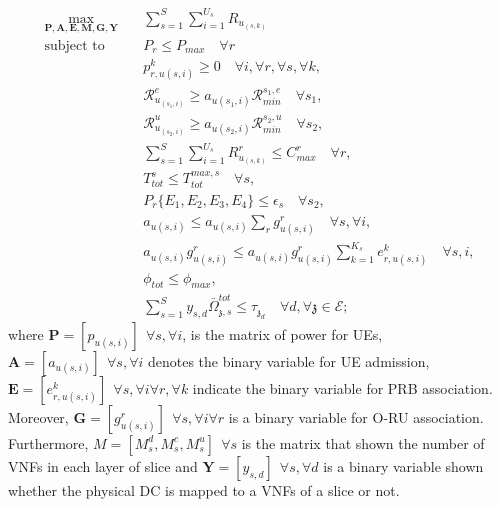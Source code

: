 \documentclass[conference]{IEEEtran}
\begin{document}
\begin{subequations}
\begin{alignat}{4}
\max\limits_{\boldsymbol{P}, \boldsymbol{A}, \boldsymbol{E}, \boldsymbol{M}, \boldsymbol{G}, \boldsymbol{Y} }   \quad &  \sum_{s=1}^{S}\sum_{i=1}^{U_s}R_{u_{(s,k)}} \ \\
\text{subject to} \quad  &  P_r \leq P_{max} \quad \forall r
 \label{c11} \\
&p_{r,u(s,i)}^{k}  \geq 0  \quad \forall i,\forall r,\forall s, \forall k,\label{c12} \\
&\mathcal{R}_{u_{(s_1,i)}}^e \geq  a_{u(s_1,i)}\mathcal{R}_{min}^{s_1,e} \quad \forall s_1, \label{c13} \\
&\mathcal{R}_{u_{(s_2,i)}}^u \geq  a_{u(s_2,i)}\mathcal{R}_{min}^{s_2,u} \quad \forall s_2, \label{c14} \\
& \sum_{s=1}^{S}\sum_{i=1}^{U_s}R_{u_{(s,k)}}^r \leq C_{max}^r \quad \forall r, \label{c15}\\ 
&T_{tot}^s \leq T_{tot}^{max,s} \quad \forall s,\label{c16} \\
& P_r\{E_1, E_2, E_3, E_4\} \leq \epsilon_s \quad \forall s_2, \label{c166}\\
&a_{u(s,i)} \leq a_{u(s,i)}\sum_{r}g^r_{u(s,i)}  \quad \forall s,\forall i, \label{c17}  \\
& a_{u(s,i)}g^r_{u(s,i)} \leq a_{u(s,i)}g^r_{u(s,i)}\sum_{k =1}^{K_s} e^{k}_{r,u(s,i)}  \quad \forall s,i , \label{c18} \\
& \phi_{tot}  \leq \phi_{max}, \label{c19} \\
 &\textstyle \sum_{s=1}^{S} y_{s,d} \bar{\Omega}_{\mathfrak{z},s}^{tot}  \leq   \tau_{\mathfrak{z}_d} 
 \quad \forall d, \forall \mathfrak{z}\in \mathcal{E}; \label{c20}
\end{alignat}
\label{constraints}
\end{subequations}
where $\boldsymbol{P} =[p_{u(s,i)}] \:\: \forall s , \forall i $, is the matrix of power for UEs, $\boldsymbol{A} =[a_{u(s,i)}] \:\: \forall s , \forall i $ denotes the binary variable for UE admission,
$\boldsymbol{E} =[e_{r,u(s,i)}^k] \:\: \forall s , \forall i \forall r, \forall k$ indicate the binary variable for PRB association. Moreover, $\boldsymbol{G} =[g_{u(s,i)}^r] \:\: \forall s , \forall i \forall r$ is a binary variable for O-RU association. Furthermore, $M = [M_s^d, M_s^c, M_s^u] \:\: \forall s$ is the matrix that shown the number of VNFs in each layer of slice and $\boldsymbol{Y} =[y_{s,d}]  \:\: \forall s ,  \forall d $ is a binary variable shown whether
the physical DC is mapped to a VNFs of a slice or not.
\end{document}
